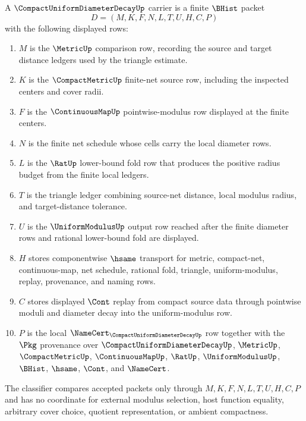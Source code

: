 \begin{definition}
\label{def:compact-uniform-diameter-decay-carrier}
A $\CompactUniformDiameterDecayUp$ carrier is a finite $\BHist$ packet
$$
D=(M,K,F,N,L,T,U,H,C,P)
$$
with the following displayed rows:
\begin{enumerate}
\item $M$ is the $\MetricUp$ comparison row, recording the source and target distance ledgers used by the triangle estimate.
\item $K$ is the $\CompactMetricUp$ finite-net source row, including the inspected centers and cover radii.
\item $F$ is the $\ContinuousMapUp$ pointwise-modulus row displayed at the finite centers.
\item $N$ is the finite net schedule whose cells carry the local diameter rows.
\item $L$ is the $\RatUp$ lower-bound fold row that produces the positive radius budget from the finite local ledgers.
\item $T$ is the triangle ledger combining source-net distance, local modulus radius, and target-distance tolerance.
\item $U$ is the $\UniformModulusUp$ output row reached after the finite diameter rows and rational lower-bound fold are displayed.
\item $H$ stores componentwise $\hsame$ transport for metric, compact-net, continuous-map, net schedule, rational fold, triangle, uniform-modulus, replay, provenance, and naming rows.
\item $C$ stores displayed $\Cont$ replay from compact source data through pointwise moduli and diameter decay into the uniform-modulus row.
\item $P$ is the local $\NameCert_{\CompactUniformDiameterDecayUp}$ row together with the $\Pkg$ provenance over $\CompactUniformDiameterDecayUp$, $\MetricUp$, $\CompactMetricUp$, $\ContinuousMapUp$, $\RatUp$, $\UniformModulusUp$, $\BHist$, $\hsame$, $\Cont$, and $\NameCert$.
\end{enumerate}
The classifier compares accepted packets only through $M,K,F,N,L,T,U,H,C,P$ and has no coordinate for external modulus selection, host function equality, arbitrary cover choice, quotient representation, or ambient compactness.
\end{definition}

